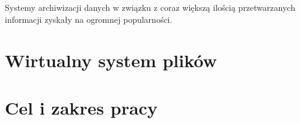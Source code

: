 Systemy archiwizacji danych 	 w związku z coraz większą ilością przetwarzanych informacji zyskały na ogromnej popularności. 
\section{Wirtualny system plików}
\section{Cel i zakres pracy}